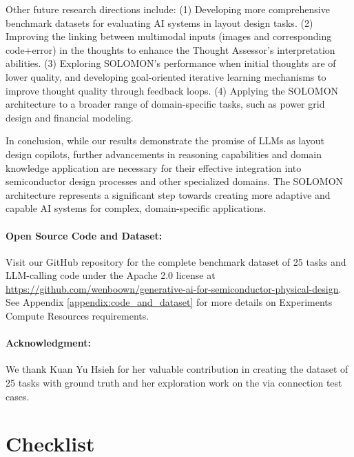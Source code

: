 \documentclass{article}
\begin{document}
Other future research directions include:
(1) Developing more comprehensive benchmark datasets for evaluating AI systems in layout design tasks.
(2) Improving the linking between multimodal inputs (images and corresponding code+error) in the thoughts to enhance the Thought Assessor's interpretation abilities.
(3) Exploring SOLOMON's performance when initial thoughts are of lower quality, and developing goal-oriented iterative learning mechanisms to improve thought quality through feedback loops.
(4) Applying the SOLOMON architecture to a broader range of domain-specific tasks, such as power grid design and financial modeling.

In conclusion, while our results demonstrate the promise of LLMs as layout design copilots, further advancements in reasoning capabilities and domain knowledge application are necessary for their effective integration into semiconductor design processes and other specialized domains. The SOLOMON architecture represents a significant step towards creating more adaptive and capable AI systems for complex, domain-specific applications.

\paragraph{Open Source Code and Dataset:} Visit our GitHub repository for the complete benchmark dataset of 25 tasks and LLM-calling code under the Apache 2.0 license at \url{https://github.com/wenboown/generative-ai-for-semiconductor-physical-design}. See Appendix \ref{appendix:code_and_dataset} for more details on Experiments Compute Resources requirements.

\paragraph{Acknowledgment:} We thank Kuan Yu Hsieh for her valuable contribution in creating the dataset of 25 tasks with ground truth and her exploration work on the via connection test cases.




\newpage
\section*{Checklist}



\newpage
\appendix
\end{document}

